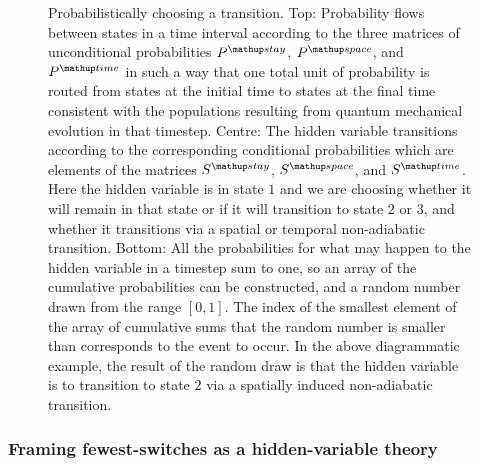 \begin{figure}[t]
    \caption{Probabilistically choosing a transition. Top: Probability flows between states in a time interval according to the three matrices of unconditional probabilities $P^\up{stay}$, $P^\up{space}$, and $P^\up{time}$ in such a way that one total unit of probability is routed from states at the initial time to states at the final time consistent with the populations resulting from quantum mechanical evolution in that timestep. Centre: The hidden variable transitions according to the corresponding conditional probabilities which are elements of the matrices $S^\up{stay}$, $S^\up{space}$, and $S^\up{time}$. Here the hidden variable is in state $1$ and we are choosing whether it will remain in that state or if it will transition to state $2$ or $3$, and whether it transitions via a spatial or temporal non-adiabatic transition. Bottom: All the probabilities for what may happen to the hidden variable in a timestep sum to one, so an array of the cumulative probabilities can be constructed, and a random number drawn from the range $[0,1]$. The index of the smallest element of the array of cumulative sums that the random number is smaller than corresponds to the event to occur. In the above diagrammatic example, the result of the random draw is that the hidden variable is to transition to state $2$ via a spatially induced non-adiabatic transition.}\label{fig:random_choice}
\end{figure}

\subsubsection{Framing fewest-switches as a hidden-variable theory}

